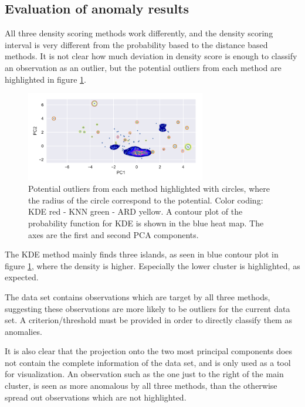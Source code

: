 \subsection{Evaluation of anomaly results}
All three density scoring methods work differently, and the density scoring interval is very different from the probability based to the distance based methods. It is not clear how much deviation in density score is enough to classify an observation as an outlier, but the potential outliers from each method are highlighted in figure \ref{fig:2DdensityPC}.
\begin{figure}[H]
    \centering
    \includegraphics[width=0.7\textwidth]{fig/2DdensityPC.pdf}
    \caption{Potential outliers from each method highlighted with circles, where the radius of the circle correspond to the potential. Color coding: KDE red - KNN green - ARD yellow. A contour plot of the probability function for KDE is shown in the blue heat map. The axes are the first and second PCA components.}
    \label{fig:2DdensityPC}
\end{figure}

The KDE method mainly finds three islands, as seen in blue contour plot in figure \ref{fig:2DdensityPC}, where the density is higher. Especially the lower cluster is highlighted, as expected.

The data set contains observations which are target by all three methods, suggesting these observations are more likely to be outliers for the current data set. A criterion/threshold must be provided in order to directly classify them as anomalies.

It is also clear that the projection onto the two most principal components does not contain the complete information of the data set, and is only used as a tool for visualization. An observation such as the one just to the right of the main cluster, is seen as more anomalous by all three methods, than the otherwise spread out observations which are not highlighted.